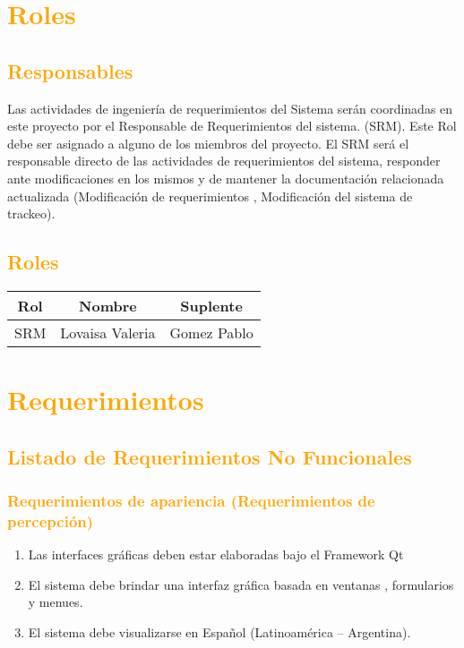 \newpage
\section{\textcolor{orange}{Roles}}
\subsection{\textcolor{orange}{Responsables}}
Las actividades de ingeniería de requerimientos del Sistema serán coordinadas en
este proyecto por el Responsable de Requerimientos del sistema. (SRM). Este Rol
debe ser asignado a alguno de los miembros del proyecto.
El SRM será el responsable directo de las actividades de requerimientos del
sistema, responder ante modificaciones en los mismos  y de mantener la
documentación relacionada actualizada (Modificación de requerimientos , Modificación del sistema de trackeo).

\subsection{\textcolor{orange}{Roles}}
\begin{table}[!h]
\begin{center}
\begin{tabular}{|c|c|c|}
\hline
\rowcolor[RGB]{255,127,0} Rol & Nombre & Suplente\\
\hline
SRM & Lovaisa Valeria & Gomez Pablo\\
\hline
\end{tabular}
\end{center}
\end{table}

\newpage
\section{\textcolor{orange}{Requerimientos}}
\subsection{\textcolor{orange}{Listado de Requerimientos No Funcionales}}
\subsubsection{\textcolor{orange}{Requerimientos de apariencia
(Requerimientos de percepción)}}
\begin{enumerate}
\item Las interfaces gráficas deben estar elaboradas bajo el Framework Qt
\item El sistema debe brindar una interfaz gráfica basada en ventanas ,
formularios y menues.
\item El sistema debe visualizarse en Español (Latinoamérica – Argentina).
\end{enumerate}


